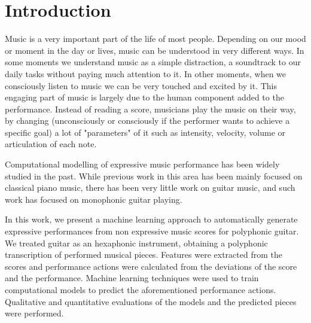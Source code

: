 \normallinespacing

\chapter{Introduction}

\label{chap:introduction}
Music is a very important part of the life of most people. Depending on our mood or moment in the day or lives, music can be understood in very different ways. In some moments we understand music as a simple distraction, a soundtrack to our daily tasks without paying much attention to it. In other moments, when we consciously listen to music we can be very touched and excited by it. This engaging part of music is largely due to the human component added to the performance. Instead of reading a score, musicians play the music on their way, by changing (unconsciously or consciously if the performer wants to achieve a specific goal) a lot of "parameters" of it such as intensity, velocity, volume or articulation of each note. 


Computational modelling of expressive music performance has been widely studied in the past. While previous work in this area has been mainly focused on classical piano music, there has been very little work on guitar music, and such work has focused on monophonic guitar playing. 

In this work, we present a machine learning approach to automatically generate expressive performances from non expressive music scores for polyphonic guitar. We treated guitar as an hexaphonic instrument, obtaining a polyphonic transcription of performed musical pieces. Features were extracted from the scores and performance actions were calculated from the deviations of the score and the performance. Machine learning techniques were used to train computational models to predict the aforementioned performance actions. Qualitative and quantitative evaluations of the models and the predicted pieces were performed. 


